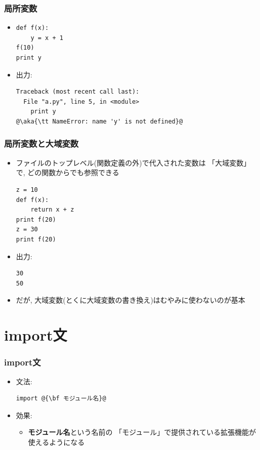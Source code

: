 \documentclass[10pt,dvipdfmx]{beamer}
\newcommand{\aka}[1]{{\color{red}#1}}
\begin{document}
\begin{frame}[fragile]
\frametitle{局所変数}
\begin{itemize}
\item 
\begin{lstlisting}
def f(x):
    y = x + 1
f(10)
print y    
\end{lstlisting}
\item 出力:
\begin{lstlisting}
Traceback (most recent call last):
  File "a.py", line 5, in <module>
    print y    
@\aka{\tt NameError: name 'y' is not defined}@
\end{lstlisting}
\end{itemize}
\end{frame}

\begin{frame}[fragile]
\frametitle{局所変数と大域変数}
\begin{itemize}
\item ファイルのトップレベル(関数定義の外)で代入された変数は
「大域変数」で, どの関数からでも参照できる
\begin{lstlisting}
z = 10
def f(x):
    return x + z
print f(20)
z = 30
print f(20)
\end{lstlisting}
\item<2-> 出力:
\begin{lstlisting}
30
50
\end{lstlisting}
\item<2-> だが, 大域変数(とくに大域変数の書き換え)はむやみに使わないのが基本
\end{itemize}
\end{frame}

\section{import文}

\begin{frame}[fragile]
\frametitle{import文}
\begin{itemize}
\item 文法:
\begin{lstlisting}
import @{\bf モジュール名}@ 
\end{lstlisting}
\item 効果:
  \begin{itemize}
  \item {\bf モジュール名}という名前の
「モジュール」で提供されている拡張機能が使えるようになる
  \end{itemize}
\end{itemize}
\end{frame}
\end{document}
